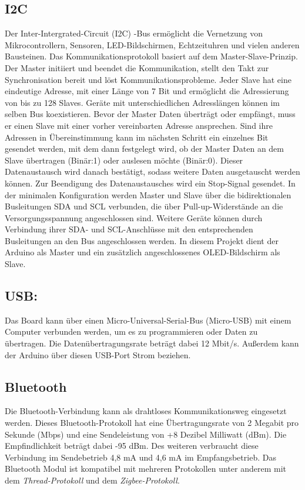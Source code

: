 \subsection{I2C}
Der Inter-Intergrated-Circuit (I2C) -Bus ermöglicht die Vernetzung von Mikrocontrollern, Sensoren, LED-Bildschirmen, Echtzeituhren und vielen anderen Bausteinen. Das Kommunikationsprotokoll basiert auf dem Master-Slave-Prinzip. Der Master initiiert und beendet die Kommunikation, stellt den Takt zur Synchronisation bereit und löst Kommunikationsprobleme. Jeder Slave hat eine eindeutige Adresse, mit einer Länge von 7 Bit und ermöglicht die Adressierung von bis zu 128 Slaves. Geräte mit unterschiedlichen Adresslängen können im selben Bus koexistieren. Bevor der Master Daten überträgt oder empfängt, muss er einen Slave mit einer vorher vereinbarten Adresse ansprechen.\cite{Meroth.2018}\cite{STM1.2015} Sind ihre Adressen in Übereinstimmung kann im nächsten Schritt ein einzelnes Bit gesendet werden, mit dem dann festgelegt wird, ob der Master Daten an dem Slave übertragen (Binär:1) oder auslesen möchte (Binär:0). Dieser Datenaustausch wird danach bestätigt, sodass weitere Daten ausgetauscht werden können. Zur Beendigung des Datenaustausches wird ein Stop-Signal gesendet.\cite{Gehrke.2022} In der minimalen Konfiguration werden Master und Slave über die bidirektionalen Busleitungen SDA und SCL verbunden, die über Pull-up-Widerstände an die Versorgungsspannung angeschlossen sind. Weitere Geräte können durch Verbindung ihrer SDA- und SCL-Anschlüsse mit den entsprechenden Busleitungen an den Bus angeschlossen werden.\cite{Meroth.2018} In diesem Projekt dient der Arduino als Master und ein zusätzlich angeschlossenes OLED-Bildschirm als Slave.

\subsection{USB:}
Das Board kann über einen Micro-Universal-Serial-Bus (Micro-USB) mit einem Computer verbunden werden, um es zu programmieren oder Daten zu übertragen. Die Datenübertragungsrate beträgt dabei 12 Mbit/s. Außerdem kann der Arduino über diesen USB-Port Strom beziehen.

\subsection{Bluetooth}
Die Bluetooth-Verbindung kann als drahtloses Kommunikationsweg eingesetzt werden. Dieses Bluetooth-Protokoll hat eine Übertragungsrate von 2 Megabit pro Sekunde (Mbps) und eine Sendeleistung von +8 Dezibel Milliwatt (dBm). Die Empfindlichkeit beträgt dabei -95 dBm. Des weiteren verbraucht diese Verbindung im Sendebetrieb 4,8 mA und 4,6 mA im Empfangsbetrieb. Das Bluetooth Modul ist kompatibel mit mehreren Protokollen unter anderem mit dem \textit{Thread-Protokoll} und dem \textit{Zigbee-Protokoll}.\cite{Ard.2024}\cite{NrdSem3.2024}

